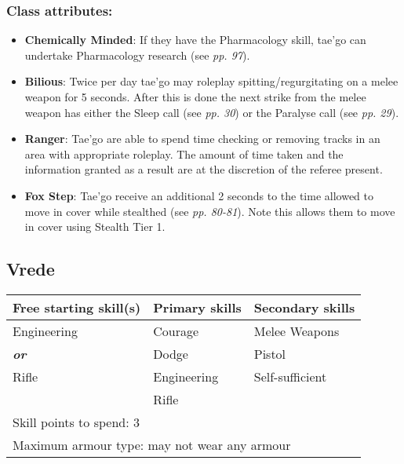 \subsubsection{Class attributes:}

\begin{itemize}
\item \textbf{Chemically Minded}: If they have the Pharmacology skill, tae'go can undertake Pharmacology research (see \textit{pp. 97}).

\item \textbf{Bilious}: Twice per day tae'go may roleplay spitting/regurgitating on a melee weapon for 5 seconds. After this is done the next strike from the melee weapon has either the Sleep call (see \textit{pp. 30}) or the Paralyse call (see \textit{pp. 29}).

\item \textbf{Ranger}: Tae'go are able to spend time checking or removing tracks in an area with appropriate roleplay. The amount of time taken and the information granted as a result are at the discretion of the referee present.

\item \textbf{Fox Step}: Tae'go receive an additional 2 seconds to the time allowed to move in cover while stealthed (see \textit{pp. 80-81}). Note this allows them to move in cover using Stealth Tier 1.

\end{itemize}
\subsection{Vrede}

\begin{table}[H]
\begin{tabular}{|l|l|l|} \hline 
Free starting skill(s) & Primary skills & Secondary skills \\
 \hline Engineering & Courage & Melee Weapons \\
 \hline \textbf{\textit{or}} & Dodge & Pistol \\
 \hline Rifle & Engineering & Self-sufficient \\
 \hline  & Rifle &  \\
 \hline \multicolumn{3}{|l|}{Skill points to spend: 3} \\
 \hline \multicolumn{3}{|l|}{Maximum armour type: may not wear any armour} \\
 \hline \end{tabular}

\end{table}

